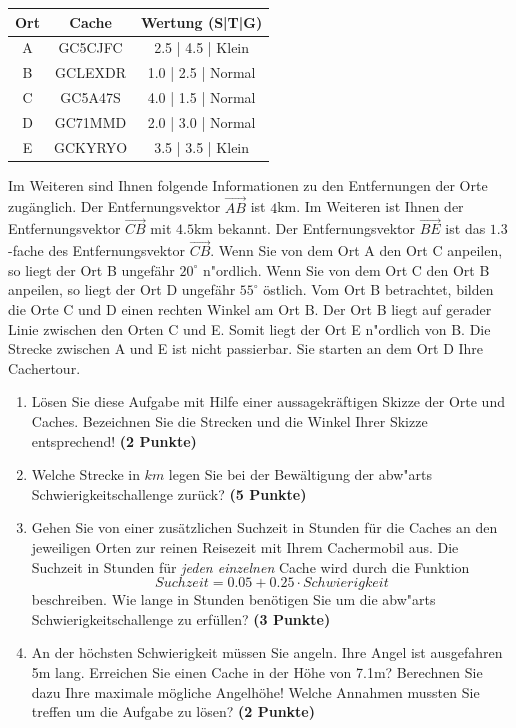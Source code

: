 \documentclass[a4paper, 9pt]{scrartcl}\usepackage[]{graphicx}\usepackage[]{xcolor}
\begin{document}
\begin{center}
  \begin{tabular}{ ccc }
    \toprule
    Ort & Cache & Wertung (S|T|G) \\
    \midrule
    A & GC5CJFC & 2.5 | 4.5 | Klein \\
    B & GCLEXDR & 1.0 | 2.5 | Normal \\ 
    C & GC5A47S & 4.0 | 1.5 | Normal \\ 
    D & GC71MMD & 2.0 | 3.0 | Normal \\ 
    E & GCKYRYO & 3.5 | 3.5 | Klein \\     
 \bottomrule
\end{tabular}
\end{center}

Im Weiteren sind Ihnen folgende Informationen zu den Entfernungen der Orte
zug{\"a}nglich. Der Entfernungsvektor $\overrightarrow{AB}$ ist
$4$km. Im Weiteren ist Ihnen der Entfernungsvektor
$\overrightarrow{CB}$ mit $4.5$km bekannt. Der
Entfernungsvektor $\overrightarrow{BE}$ ist das $1.3$-fache
des Entfernungsvektor $\overrightarrow{CB}$. Wenn Sie von dem Ort A den Ort
C anpeilen, so liegt der Ort B ungef{\"a}hr $20^\circ$
n{"o}rdlich. Wenn Sie von dem Ort C den Ort B anpeilen, so liegt
der Ort D ungef{\"a}hr $55^\circ$ {\"o}stlich. Vom Ort B
betrachtet, bilden die Orte C und D einen rechten Winkel am Ort B. Der Ort
B liegt auf gerader Linie zwischen den Orten C und E. Somit liegt der Ort E
n{"o}rdlich von B. Die Strecke zwischen A und E ist nicht
passierbar. Sie starten an dem Ort D Ihre Cachertour. \\

\begin{enumerate}
\item L{\"o}sen Sie diese Aufgabe mit Hilfe einer aussagekr{\"a}ftigen Skizze der
  Orte und Caches. Bezeichnen Sie die Strecken und die Winkel Ihrer Skizze
  entsprechend! \textbf{(2 Punkte)}
\item Welche Strecke in $km$ legen Sie bei der Bew{\"a}ltigung der
  abw{"a}rts Schwierigkeitschallenge zur{\"u}ck? \textbf{(5
    Punkte)}
\item Gehen Sie von einer zus{\"a}tzlichen Suchzeit in Stunden f{\"u}r die
  Caches an den jeweiligen Orten zur reinen Reisezeit mit Ihrem Cachermobil
  aus. Die Suchzeit in Stunden f{\"u}r \textit{jeden einzelnen} Cache wird durch die
  Funktion
  \begin{equation*}
    Suchzeit = 0.05 + 0.25 \cdot Schwierigkeit
  \end{equation*}  
  beschreiben.  Wie lange in Stunden ben{\"o}tigen Sie um die
  abw{"a}rts Schwierigkeitschallenge zu erf{\"u}llen? \textbf{(3 Punkte)}
\item An der h{\"o}chsten Schwierigkeit m{\"u}ssen Sie angeln. Ihre Angel ist
  ausgefahren 5m lang. Erreichen Sie einen Cache in der H{\"o}he
  von 7.1m?  Berechnen Sie dazu Ihre maximale m{\"o}gliche
  Angelh{\"o}he! Welche Annahmen mussten Sie treffen um die Aufgabe zu l{\"o}sen? \textbf{(2 Punkte)} 
\end{enumerate}
\end{document}
